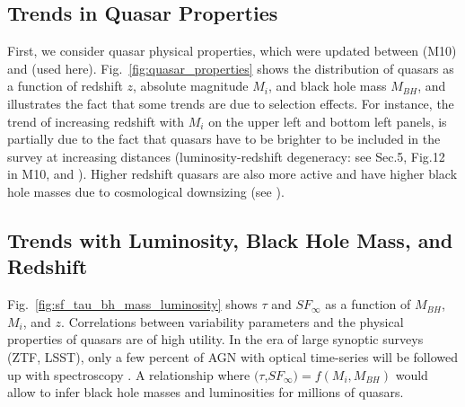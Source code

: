 \documentclass[twocolumn]{aastex62}
\begin{document}
\subsection{Trends in Quasar Properties}

\begin{figure*}
\caption{Distribution of quasars as a function of  redshift, observed i-band magnitude, absolute i-band magnitude (K-corrected to z=2), and virial black hole mass. All quantities from \citep{shen2011}. }
\label{fig:quasar_properties}
\end{figure*} 

First, we consider quasar physical properties, which were updated between \citealt{shen2008} (M10) and  \citealt{shen2011} (used here).  Fig.~\ref{fig:quasar_properties} shows the distribution of quasars as a function of redshift $z$, absolute magnitude $M_{i}$, and black hole mass $M_{BH}$, and illustrates the fact that some trends are due to selection effects. For instance, the trend of increasing redshift with $M_{i}$ on the upper left and bottom left panels, is partially due to the fact that quasars have to be brighter to be included in the survey at increasing distances (luminosity-redshift degeneracy: see Sec.5, Fig.12 in M10, and \citealt{dong2018}). Higher redshift quasars are also more active  and have higher black hole masses due to cosmological downsizing (see \citealt{babic2007,labita2009, mclure2004}).



\subsection{Trends with Luminosity, Black Hole Mass, and Redshift}

Fig.~\ref{fig:sf_tau_bh_mass_luminosity} shows $\tau$ and $SF_{\infty}$ as a function of $M_{BH}$, $M_{i}$, and $z$. Correlations between variability parameters and the physical properties of quasars are of high utility. In the era of large synoptic surveys (ZTF, LSST), only a few percent of AGN with optical time-series will be followed up with spectroscopy \citep{ivezic2019}. A relationship where $(\tau$,$SF_{\infty}) = f(M_{i}, M_{BH})$ would allow to infer black hole masses  and luminosities for millions of quasars.

\begin{figure*}
\caption{Long-term variability ($SF_{\infty}$), and characteristic timescale ($\tau$), as a function of absolute i-band magnitude (K-corrected to redshift 2, proxy for bolometric luminosity), virial black hole mass, and redshift. }
\label{fig:sf_tau_bh_mass_luminosity}
\end{figure*} 
\end{document}
